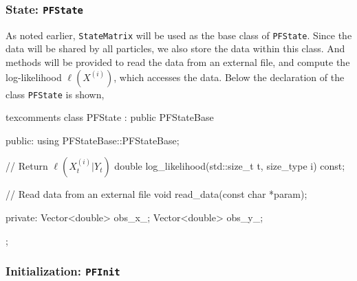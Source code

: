 \subsubsection{State: \texttt{PFState}}

As noted earlier, \verb|StateMatrix| will be used as the base class of
\verb|PFState|. Since the data will be shared by all particles, we also store
the data within this class. And methods will be provided to read the data from
an external file, and compute the log-likelihood $\ell(X^{(i)})$, which
accesses the data. Below the declaration of the class \verb|PFState| is shown,
\begin{cppcode*}{texcomments}
  class PFState : public PFStateBase
  {
      public:
      using PFStateBase::PFStateBase;

      // Return $\ell(X_t^{(i)}|Y_t)$
      double log_likelihood(std::size_t t, size_type i) const;

      // Read data from an external file
      void read_data(const char *param);

      private:
      Vector<double> obs_x_;
      Vector<double> obs_y_;
  };
\end{cppcode*}

\subsubsection{Initialization: \texttt{PFInit}}

